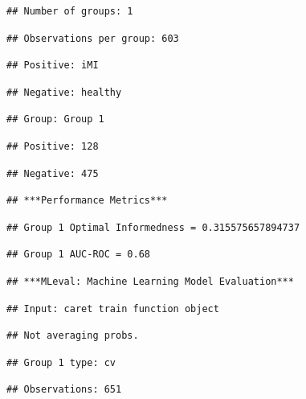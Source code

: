 \documentclass[
]{article}
\begin{document}
\begin{verbatim}
## Number of groups: 1
\end{verbatim}

\begin{verbatim}
## Observations per group: 603
\end{verbatim}

\begin{verbatim}
## Positive: iMI
\end{verbatim}

\begin{verbatim}
## Negative: healthy
\end{verbatim}

\begin{verbatim}
## Group: Group 1
\end{verbatim}

\begin{verbatim}
## Positive: 128
\end{verbatim}

\begin{verbatim}
## Negative: 475
\end{verbatim}

\begin{verbatim}
## ***Performance Metrics***
\end{verbatim}

\begin{verbatim}
## Group 1 Optimal Informedness = 0.315575657894737
\end{verbatim}

\begin{verbatim}
## Group 1 AUC-ROC = 0.68
\end{verbatim}

\begin{verbatim}
## ***MLeval: Machine Learning Model Evaluation***
\end{verbatim}

\begin{verbatim}
## Input: caret train function object
\end{verbatim}

\begin{verbatim}
## Not averaging probs.
\end{verbatim}

\begin{verbatim}
## Group 1 type: cv
\end{verbatim}

\begin{verbatim}
## Observations: 651
\end{verbatim}
\end{document}
